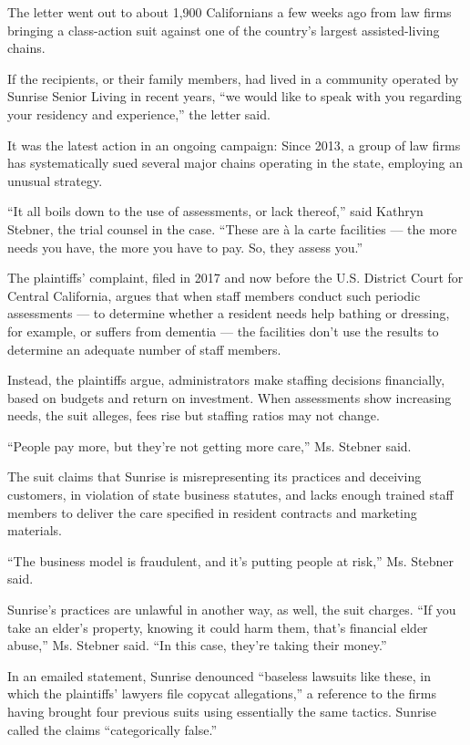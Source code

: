 The letter went out to about 1,900 Californians a few weeks ago from law
firms bringing a class-action suit against one of the country's largest
assisted-living chains.

If the recipients, or their family members, had lived in a community
operated by Sunrise Senior Living in recent years, ``we would like to
speak with you regarding your residency and experience,'' the letter
said.

It was the latest action in an ongoing campaign: Since 2013, a group of
law firms has systematically sued several major chains operating in the
state, employing an unusual strategy.

``It all boils down to the use of assessments, or lack thereof,'' said
Kathryn Stebner, the trial counsel in the case. ``These are à la carte
facilities --- the more needs you have, the more you have to pay. So,
they assess you.''

The plaintiffs' complaint, filed in 2017 and now before the U.S.
District Court for Central California, argues that when staff members
conduct such periodic assessments --- to determine whether a resident
needs help bathing or dressing, for example, or suffers from dementia
--- the facilities don't use the results to determine an adequate number
of staff members.

Instead, the plaintiffs argue, administrators make staffing decisions
financially, based on budgets and return on investment. When assessments
show increasing needs, the suit alleges, fees rise but staffing ratios
may not change.

``People pay more, but they're not getting more care,'' Ms. Stebner
said.

The suit claims that Sunrise is misrepresenting its practices and
deceiving customers, in violation of state business statutes, and lacks
enough trained staff members to deliver the care specified in resident
contracts and marketing materials.

``The business model is fraudulent, and it's putting people at risk,''
Ms. Stebner said.

Sunrise's practices are unlawful in another way, as well, the suit
charges. ``If you take an elder's property, knowing it could harm them,
that's financial elder abuse,'' Ms. Stebner said. ``In this case,
they're taking their money.''

In an emailed statement, Sunrise denounced ``baseless lawsuits like
these, in which the plaintiffs' lawyers file copycat allegations,'' a
reference to the firms having brought four previous suits using
essentially the same tactics. Sunrise called the claims ``categorically
false.''


